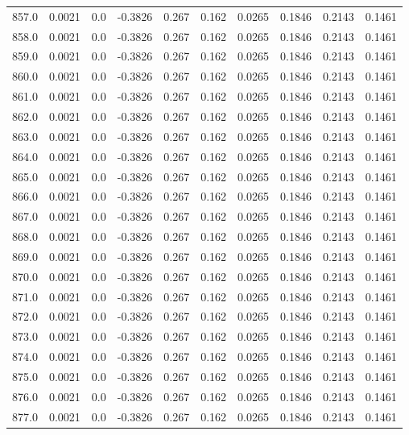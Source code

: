 \begin{longtable}{lrrrrrrrrr}
857.0 & 0.0021 & 0.0 & -0.3826 & 0.267 & 0.162 & 0.0265 & 0.1846 & 0.2143 & 0.1461 \\
858.0 & 0.0021 & 0.0 & -0.3826 & 0.267 & 0.162 & 0.0265 & 0.1846 & 0.2143 & 0.1461 \\
859.0 & 0.0021 & 0.0 & -0.3826 & 0.267 & 0.162 & 0.0265 & 0.1846 & 0.2143 & 0.1461 \\
860.0 & 0.0021 & 0.0 & -0.3826 & 0.267 & 0.162 & 0.0265 & 0.1846 & 0.2143 & 0.1461 \\
861.0 & 0.0021 & 0.0 & -0.3826 & 0.267 & 0.162 & 0.0265 & 0.1846 & 0.2143 & 0.1461 \\
862.0 & 0.0021 & 0.0 & -0.3826 & 0.267 & 0.162 & 0.0265 & 0.1846 & 0.2143 & 0.1461 \\
863.0 & 0.0021 & 0.0 & -0.3826 & 0.267 & 0.162 & 0.0265 & 0.1846 & 0.2143 & 0.1461 \\
864.0 & 0.0021 & 0.0 & -0.3826 & 0.267 & 0.162 & 0.0265 & 0.1846 & 0.2143 & 0.1461 \\
865.0 & 0.0021 & 0.0 & -0.3826 & 0.267 & 0.162 & 0.0265 & 0.1846 & 0.2143 & 0.1461 \\
866.0 & 0.0021 & 0.0 & -0.3826 & 0.267 & 0.162 & 0.0265 & 0.1846 & 0.2143 & 0.1461 \\
867.0 & 0.0021 & 0.0 & -0.3826 & 0.267 & 0.162 & 0.0265 & 0.1846 & 0.2143 & 0.1461 \\
868.0 & 0.0021 & 0.0 & -0.3826 & 0.267 & 0.162 & 0.0265 & 0.1846 & 0.2143 & 0.1461 \\
869.0 & 0.0021 & 0.0 & -0.3826 & 0.267 & 0.162 & 0.0265 & 0.1846 & 0.2143 & 0.1461 \\
870.0 & 0.0021 & 0.0 & -0.3826 & 0.267 & 0.162 & 0.0265 & 0.1846 & 0.2143 & 0.1461 \\
871.0 & 0.0021 & 0.0 & -0.3826 & 0.267 & 0.162 & 0.0265 & 0.1846 & 0.2143 & 0.1461 \\
872.0 & 0.0021 & 0.0 & -0.3826 & 0.267 & 0.162 & 0.0265 & 0.1846 & 0.2143 & 0.1461 \\
873.0 & 0.0021 & 0.0 & -0.3826 & 0.267 & 0.162 & 0.0265 & 0.1846 & 0.2143 & 0.1461 \\
874.0 & 0.0021 & 0.0 & -0.3826 & 0.267 & 0.162 & 0.0265 & 0.1846 & 0.2143 & 0.1461 \\
875.0 & 0.0021 & 0.0 & -0.3826 & 0.267 & 0.162 & 0.0265 & 0.1846 & 0.2143 & 0.1461 \\
876.0 & 0.0021 & 0.0 & -0.3826 & 0.267 & 0.162 & 0.0265 & 0.1846 & 0.2143 & 0.1461 \\
877.0 & 0.0021 & 0.0 & -0.3826 & 0.267 & 0.162 & 0.0265 & 0.1846 & 0.2143 & 0.1461 \\

\end{longtable}
